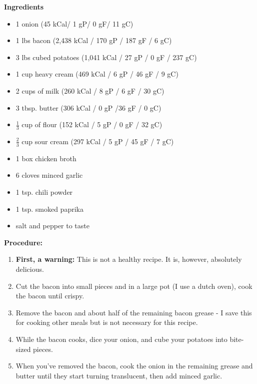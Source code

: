 \documentclass{report}
\begin{document}


\bigskip

\bigskip

\begin{multicols}{2}
\textbf{Ingredients}
\begin{itemize}
\item 1 onion \quad (45 kCal/ 1 gP/ 0 gF/ 11 gC)
\item 1 lbs bacon \quad (2,438 kCal / 170 gP / 187 gF / 6 gC)
\item 3 lbs cubed potatoes \quad (1,041 kCal / 27 gP / 0 gF / 237 gC) 
\item 1 cup heavy cream \quad (469 kCal / 6 gP / 46 gF / 9 gC)
\item 2 cups of milk  \quad (260 kCal / 8 gP / 6 gF / 30 gC)
\item 3 tbsp. butter \quad (306 kCal / 0 gP /36 gF / 0 gC) 
\item $\frac{1}{3}$ cup of flour \quad (152 kCal / 5 gP / 0 gF / 32 gC) 
\item $\frac{2}{3}$ cup sour cream \quad (297 kCal / 5 gP / 45 gF / 7 gC)
\item 1 box chicken broth 
\item 6 cloves minced garlic
\item 1 tsp. chili powder
\item 1 tsp. smoked paprika
\item salt and pepper to taste 


\end{itemize}


\columnbreak
\textbf{Procedure:}
\medskip


\begin{enumerate}
\item \textbf{First, a warning:} This is not a healthy recipe. It is, however, absolutely delicious. 
\item Cut the bacon into small pieces and in a large pot (I use a dutch oven), cook the bacon until crispy. \item Remove the bacon and about half of the remaining bacon grease - I save this for cooking other meals but is not necessary for this recipe. 


\medskip
\item While the bacon cooks, dice your onion, and cube your potatoes into bite-sized pieces. 
\item When you've removed the bacon, cook the onion in the remaining grease and butter until they start turning translucent, then add minced garlic. 


\end{enumerate}
\end{multicols}
\end{document}
